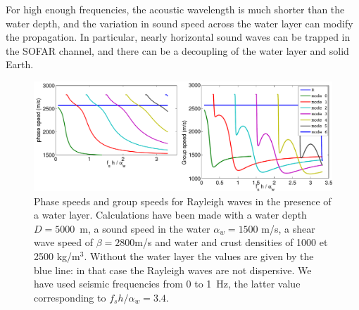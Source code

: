 For high enough frequencies, the acoustic wavelength is much shorter than the water depth, and the variation 
in sound speed across the water layer can modify the propagation. In particular, nearly horizontal sound waves can 
be trapped in the SOFAR channel, and there can be a decoupling of the water layer and solid Earth. 
\begin{figure}[ht]
\centerline{\includegraphics[width=\textwidth]{FIGS_CH_SISMO/Rayleigh_Cg_C.pdf}}
  \caption{Phase speeds and group speeds for Rayleigh waves in the presence 
  of a water layer. Calculations have been made with a water depth $D=5000$~m, a sound speed in the water $\alpha_w=1500$ m/s, a shear wave speed of  
$\beta=2800$m/s and water and crust densities of  1000 et 2500 kg/m$^3$.  Without the water layer the values are given by the blue line: 
in that case the Rayleigh waves are not dispersive. We have used seismic frequencies from 0 to 1~Hz, the latter value corresponding to $f_s h/\alpha_w=3.4$.  }
\label{fig:Rayleigh_dispersion}
\end{figure}

